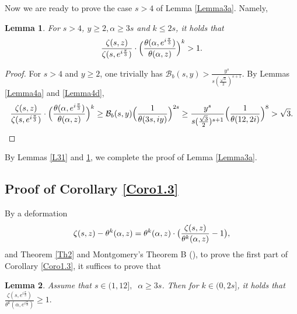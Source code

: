 \documentclass[reqno,english]{amsart}
\newtheorem{lemma}{Lemma}[section]
\newtheorem{open problem}{Open Problem}[section]
\newtheorem{open question}{Open Question}[section]
\newtheorem{open questions on hexagonal lattice}{Open Questions on hexagonal lattice}[section]
\begin{document}
Now we are ready to prove the case $s>4$ of Lemma \ref{Lemma3a}. Namely,
\begin{lemma}\label{L32}
For $s>4$, $y\geq2, \alpha\geq3s$ and $k\leq2s$, it holds that
\begin{equation}\aligned\nonumber
\frac{\zeta(s,z)}{\zeta(s,e^{i\frac{\pi}{3}})}\cdot\Big(\frac{\theta(\alpha,e^{i\frac{\pi}{3}})}{\theta(\alpha,z)}\Big)^{k}>1.
 \endaligned\end{equation}

\end{lemma}

\begin{proof} For $s>4$ and $y\geq2$, one trivially has $\mathcal{B}_b(s,y)>\frac{y^s}{s(\frac{\sqrt3}{2})^{s+1}}$.
 By Lemmas \ref{Lemma4a} and \ref{Lemma4d},
\begin{equation}\aligned\nonumber
\frac{\zeta(s,z)}{\zeta(s,e^{i\frac{\pi}{3}})}\cdot\Big(\frac{\theta(\alpha,e^{i\frac{\pi}{3}})}{\theta(\alpha,z)}\Big)^{k}
\geq \mathcal{B}_b(s,y)\Big(\frac{1}{\theta(3s,iy)}\Big)^{2s}
\geq \frac{y^s}{s(\frac{\sqrt3}{2})^{s+1}}\Big(\frac{1}{\theta(12,2i)}\Big)^{8}>\sqrt3.
 \endaligned\end{equation}

\end{proof}

By Lemmas \ref{L31} and \ref{L32}, we complete the proof of Lemma \ref{Lemma3a}.


\subsection{Proof of Corollary \ref{Coro1.3}}




By a deformation
 \begin{equation}\aligned\nonumber
{\zeta(s,z)}-{\theta^k(\alpha,z)}=\theta^k(\alpha,z)\cdot\big(
\frac{\zeta(s,z)}{\theta^k(\alpha,z)}-1
\big),
\endaligned\end{equation}
and Theorem \ref{Th2} and Montgomery's Theorem B (\cite{Mon1988}), to prove the first part of Corollary \ref{Coro1.3},  it suffices to prove that

\begin{lemma}\label{Lemma4.28}
Assume that $s\in(1,12],\;\; \alpha\geq 3s$. Then for $k\in(0,2s]$, it holds that
$
\frac{\zeta(s,e^{i\frac{\pi}{3}})}{\theta^k(\alpha,e^{i\frac{\pi}{3}})}\geq1.
$

\end{lemma}
\end{document}
